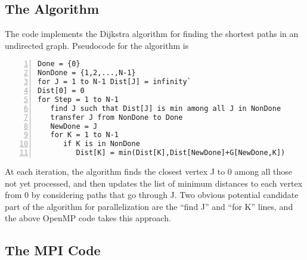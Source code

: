 \subsection{The Algorithm}

The code implements the Dijkstra algorithm for finding the shortest
paths in an undirected graph.  Pseudocode for the algorithm is

\begin{Verbatim}[fontsize=\relsize{-2},numbers=left]
Done = {0}
NonDone = {1,2,...,N-1}
for J = 1 to N-1 Dist[J] = infinity`
Dist[0] = 0
for Step = 1 to N-1
   find J such that Dist[J] is min among all J in NonDone
   transfer J from NonDone to Done
   NewDone = J
   for K = 1 to N-1
      if K is in NonDone
         Dist[K] = min(Dist[K],Dist[NewDone]+G[NewDone,K])
\end{Verbatim}

At each iteration, the algorithm finds the closest vertex J to 0 among
all those not yet processed, and then updates the list of minimum
distances to each vertex from 0 by considering paths that go through J.
Two obvious potential candidate part of the algorithm for
parallelization are the ``find J'' and ``for K'' lines, and the above
OpenMP code takes this approach.

\subsection{The MPI Code}


